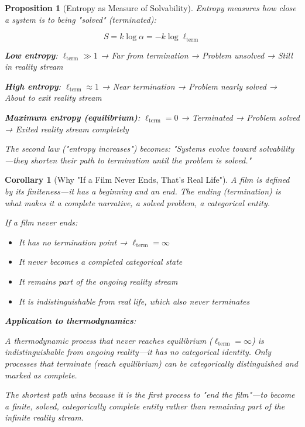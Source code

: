 \documentclass[12pt,a4paper]{article}
\newtheorem{corollary}[theorem]{Corollary}
\newtheorem{proposition}[theorem]{Proposition}
\theoremstyle{remark}
\begin{document}
\begin{proposition}[Entropy as Measure of Solvability]
Entropy measures how close a system is to being "solved" (terminated):

\begin{equation}
S = k \log \alpha = -k \log \ell_{\text{term}}
\end{equation}

\textbf{Low entropy}: $\ell_{\text{term}} \gg 1$ → Far from termination → Problem unsolved → Still in reality stream

\textbf{High entropy}: $\ell_{\text{term}} \approx 1$ → Near termination → Problem nearly solved → About to exit reality stream

\textbf{Maximum entropy (equilibrium)}: $\ell_{\text{term}} = 0$ → Terminated → Problem solved → Exited reality stream completely

The second law ("entropy increases") becomes: "Systems evolve toward solvability—they shorten their path to termination until the problem is solved."
\end{proposition}

\begin{corollary}[Why "If a Film Never Ends, That's Real Life"]
A film is defined by its finiteness—it has a beginning and an end. The ending (termination) is what makes it a complete narrative, a solved problem, a categorical entity.

If a film never ends:
\begin{itemize}
\item It has no termination point → $\ell_{\text{term}} = \infty$
\item It never becomes a completed categorical state
\item It remains part of the ongoing reality stream
\item It is indistinguishable from real life, which also never terminates
\end{itemize}

\textbf{Application to thermodynamics}:

A thermodynamic process that never reaches equilibrium ($\ell_{\text{term}} = \infty$) is indistinguishable from ongoing reality—it has no categorical identity. Only processes that terminate (reach equilibrium) can be categorically distinguished and marked as complete.

The shortest path wins because it is the first process to "end the film"—to become a finite, solved, categorically complete entity rather than remaining part of the infinite reality stream.
\end{corollary}
\end{document}
